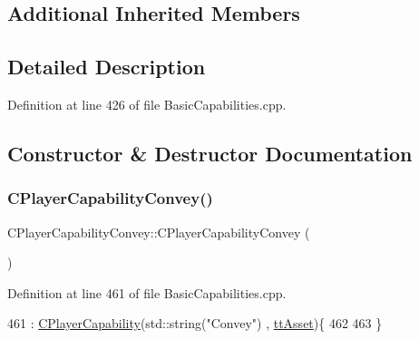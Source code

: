 \subsection*{Additional Inherited Members}


\subsection{Detailed Description}


Definition at line 426 of file Basic\+Capabilities.\+cpp.



\subsection{Constructor \& Destructor Documentation}
\hypertarget{classCPlayerCapabilityConvey_a49f00731755778e903503796adbbe451}{}\label{classCPlayerCapabilityConvey_a49f00731755778e903503796adbbe451} 
\subsubsection{\texorpdfstring{C\+Player\+Capability\+Convey()}{CPlayerCapabilityConvey()}}
{\footnotesize\ttfamily C\+Player\+Capability\+Convey\+::\+C\+Player\+Capability\+Convey (\begin{DoxyParamCaption}{ }\end{DoxyParamCaption})\hspace{0.3cm}{\ttfamily [protected]}}



Definition at line 461 of file Basic\+Capabilities.\+cpp.


\begin{DoxyCode}
461                                                  : \hyperlink{classCPlayerCapability_a303de62aba5d3f65d9a8e013c64a96c1}{CPlayerCapability}(std::string(\textcolor{stringliteral}{"Convey"})
      , \hyperlink{classCPlayerCapability_a9d3450ed1532fd536bd6cbb1e2eef02facb6ee2a28b5d50b9d3009c272f2881aa}{ttAsset})\{
462 
463 \}
\end{DoxyCode}
\hypertarget{classCPlayerCapabilityConvey_a687e07da4e0f552bd0629183c407229f}{}\label{classCPlayerCapabilityConvey_a687e07da4e0f552bd0629183c407229f} 

